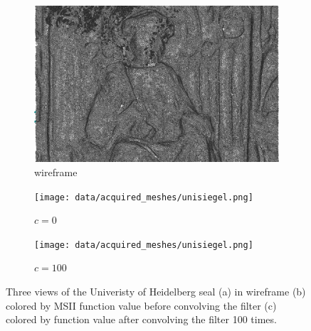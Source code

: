 \begin{figure}[ht]
	\begin{subfigure}[b]{0.32\linewidth}
		\includegraphics[width=\linewidth]{data/acquired_meshes/unisiegel_wireframe.png}
		\caption{wireframe}\label{fig:unisiegel.a}
	\end{subfigure}
	\begin{subfigure}[b]{0.32\linewidth}
		\texttt{[image: data/acquired\_meshes/unisiegel.png]}
		\caption{$c=0$}\label{fig:unisiegel.b}
	\end{subfigure}
	\begin{subfigure}[b]{0.32\linewidth}
		\texttt{[image: data/acquired\_meshes/unisiegel.png]}
		\caption{$c=100$}\label{fig:unisiegel.c}
	\end{subfigure}
	\caption[Three views of the Univeristy of Heidelberg seal]{Three views of the Univeristy of Heidelberg seal (a) in wireframe (b) colored by MSII function value before convolving the filter (c) colored by function value after convolving the filter 100 times.}
	\label{fig:unisiegel}
\end{figure}
\todoCitation{}
